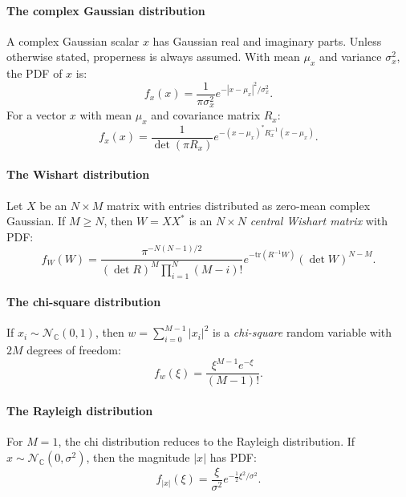 \documentclass[a4paper, 12pt]{book}
\begin{document}
\paragraph{The complex Gaussian distribution}
A complex Gaussian scalar $x$ has Gaussian real and imaginary parts. Unless otherwise stated, properness is always assumed. With mean $\mu_{x}$ and variance $\sigma_{x}^{2}$, the PDF of $x$ is:
\begin{equation}
    f_{x}(x) = \frac{1}{\pi\sigma_{x}^{2}}e^{-|x-\mu_{x}|^{2}/\sigma_{x}^{2}}. \tag{C.14}
\end{equation}
For a vector $x$ with mean $\mu_{x}$ and covariance matrix $R_{x}$:
\begin{equation}
    f_{x}(x) = \frac{1}{\det(\pi R_{x})}e^{-(x-\mu_{x})^{*}R_{x}^{-1}(x-\mu_{x})}. \tag{C.15}
\end{equation}

\paragraph{The Wishart distribution}
Let $X$ be an $N\times M$ matrix with entries distributed as zero-mean complex Gaussian. If $M \ge N$, then $W=XX^{*}$ is an $N\times N$ \textit{central Wishart matrix} with PDF:
\begin{equation}
    f_{W}(W) = \frac{\pi^{-N(N-1)/2}}{(\det R)^{M}\prod_{i=1}^{N}(M-i)!}e^{-\text{tr}(R^{-1}W)}(\det W)^{N-M}. \tag{C.22}
\end{equation}

\paragraph{The chi-square distribution}
If $x_{i}\sim\mathcal{N}_{\mathbb{C}}(0,1)$, then $w=\sum_{i=0}^{M-1}|x_{i}|^{2}$ is a \textit{chi-square} random variable with $2M$ degrees of freedom:
\begin{equation}
    f_{w}(\xi) = \frac{\xi^{M-1}e^{-\xi}}{(M-1)!}. \tag{C.33}
\end{equation}

\paragraph{The Rayleigh distribution}
For $M=1$, the chi distribution reduces to the Rayleigh distribution. If $x \sim \mathcal{N}_{\mathbb{C}}(0, \sigma^2)$, then the magnitude $|x|$ has PDF:
\begin{equation}
    f_{|x|}(\xi) = \frac{\xi}{\sigma^{2}}e^{-\frac{1}{2}\xi^{2}/\sigma^{2}}. \tag{C.43}
\end{equation}
\end{document}
